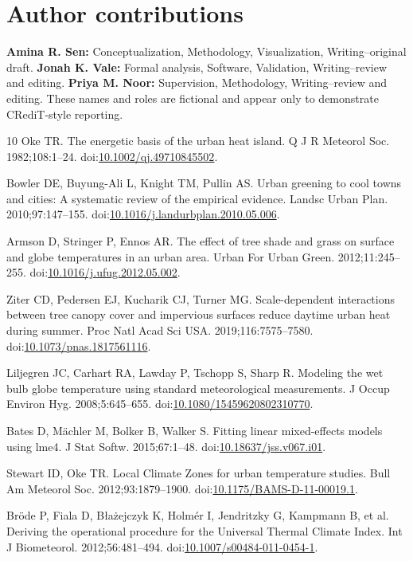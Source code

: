 \section*{Author contributions}
\textbf{Amina R. Sen:} Conceptualization, Methodology, Visualization, Writing--original draft. \textbf{Jonah K. Vale:} Formal analysis, Software, Validation, Writing--review and editing. \textbf{Priya M. Noor:} Supervision, Methodology, Writing--review and editing. These names and roles are fictional and appear only to demonstrate CRediT-style reporting.

\begingroup
\raggedright
\begin{thebibliography}{10}
Oke TR. The energetic basis of the urban heat island. Q J R Meteorol Soc. 1982;108:1--24. doi:\href{https://doi.org/10.1002/qj.49710845502}{10.1002/qj.49710845502}.

Bowler DE, Buyung-Ali L, Knight TM, Pullin AS. Urban greening to cool towns and cities: A systematic review of the empirical evidence. Landsc Urban Plan. 2010;97:147--155. doi:\href{https://doi.org/10.1016/j.landurbplan.2010.05.006}{10.1016/j.landurbplan.2010.05.006}.

Armson D, Stringer P, Ennos AR. The effect of tree shade and grass on surface and globe temperatures in an urban area. Urban For Urban Green. 2012;11:245--255. doi:\href{https://doi.org/10.1016/j.ufug.2012.05.002}{10.1016/j.ufug.2012.05.002}.

Ziter CD, Pedersen EJ, Kucharik CJ, Turner MG. Scale-dependent interactions between tree canopy cover and impervious surfaces reduce daytime urban heat during summer. Proc Natl Acad Sci USA. 2019;116:7575--7580. doi:\href{https://doi.org/10.1073/pnas.1817561116}{10.1073/pnas.1817561116}.

Liljegren JC, Carhart RA, Lawday P, Tschopp S, Sharp R. Modeling the wet bulb globe temperature using standard meteorological measurements. J Occup Environ Hyg. 2008;5:645--655. doi:\href{https://doi.org/10.1080/15459620802310770}{10.1080/15459620802310770}.

Bates D, M\"achler M, Bolker B, Walker S. Fitting linear mixed-effects models using lme4. J Stat Softw. 2015;67:1--48. doi:\href{https://doi.org/10.18637/jss.v067.i01}{10.18637/jss.v067.i01}.

Stewart ID, Oke TR. Local Climate Zones for urban temperature studies. Bull Am Meteorol Soc. 2012;93:1879--1900. doi:\href{https://doi.org/10.1175/BAMS-D-11-00019.1}{10.1175/BAMS-D-11-00019.1}.

Br\"ode P, Fiala D, B\l a\.{z}ejczyk K, Holm\'er I, Jendritzky G, Kampmann B, et al. Deriving the operational procedure for the Universal Thermal Climate Index. Int J Biometeorol. 2012;56:481--494. doi:\href{https://doi.org/10.1007/s00484-011-0454-1}{10.1007/s00484-011-0454-1}.
\end{thebibliography}
\endgroup
